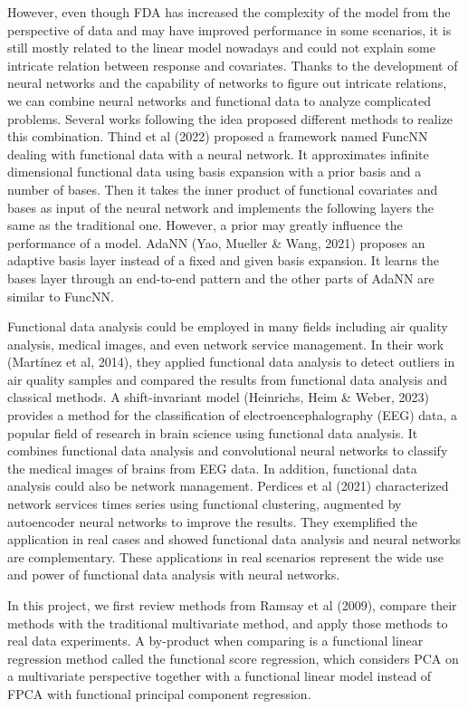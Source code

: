 However, even though FDA has increased the complexity of the model from the perspective of data and may have improved performance in some scenarios, it is still mostly related to the linear model nowadays and could not explain some intricate relation between response and covariates. Thanks to the development of neural networks and the capability of networks to figure out intricate relations, we can combine neural networks and functional data to analyze complicated problems. Several works following the idea proposed different methods to realize this combination. Thind et al (2022) proposed a framework named FuncNN dealing with functional data with a neural network. It approximates infinite dimensional functional data using basis expansion with a prior basis and a number of bases. Then it takes the inner product of functional covariates and bases as input of the neural network and implements the following layers the same as the traditional one. However, a prior may greatly influence the performance of a model. AdaNN (Yao, Mueller \& Wang, 2021) proposes an adaptive basis layer instead of a fixed and given basis expansion. It learns the bases layer through an end-to-end pattern and the other parts of AdaNN are similar to FuncNN. 

Functional data analysis could be employed in many fields including air quality analysis, medical images, and even network service management. In their work (Martínez et al, 2014), they applied functional data analysis to detect outliers in air quality samples and compared the results from functional data analysis and classical methods. A shift-invariant model (Heinrichs, Heim \& Weber, 2023) provides a method for the classification of electroencephalography (EEG) data, a popular field of research in brain science using functional data analysis. It combines functional data analysis and convolutional neural networks to classify the medical images of brains from EEG data. In addition, functional data analysis could also be network management. Perdices et al (2021) characterized network services times series using functional clustering, augmented by autoencoder neural networks to improve the results. They exemplified the application in real cases and showed functional data analysis and neural networks are complementary. These applications in real scenarios represent the wide use and power of functional data analysis with neural networks. 


In this project, we first review methods from Ramsay et al (2009), compare their methods with the traditional multivariate method, and apply those methods to real data experiments. A by-product when comparing is a functional linear regression method called the functional score regression, which considers PCA on a multivariate perspective together with a functional linear model instead of FPCA with functional principal component regression. 

